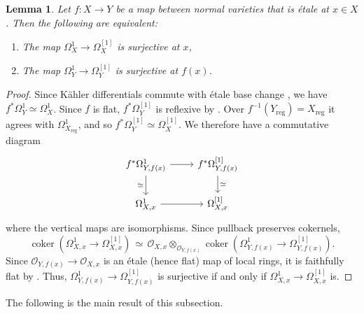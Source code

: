 \documentclass{amsart}
\newtheorem{lemma}[lemma]{Lemma}
\theoremstyle{definition}
\newcommand{\cO}{\mathcal{O}}
\DeclareMathOperator{\reg}{reg}
\DeclareMathOperator{\coker}{coker}
\begin{document}
\begin{lemma}\label{lemma:surj-etale-local}
    Let $f: X\to Y$ be a map between normal varieties that is \'etale at $x\in X$. Then the following are equivalent:
    \begin{enumerate}
        \item The map $\Omega_X^1\to \Omega_X^{[1]}$ is surjective at $x$,
        \item The map $\Omega_Y^1\to \Omega_Y^{[1]}$ is surjective at $f(x)$.
    \end{enumerate}
\end{lemma}
\begin{proof}

    Since K\"ahler differentials commute with \'etale base change \cite[Tag 0FLV]{stacks-project}, we have $f^*\Omega_Y^1\simeq\Omega_X^1$. Since $f$ is flat, $f^*\Omega_Y^{[1]}$ is reflexive by \cite[Proposition 1.8]{Hartshorne1980}. Over $f^{-1}(Y_{\reg})=X_{\reg}$ it agrees with $\Omega^1_{X_{\reg}}$, and so $f^*\Omega_Y^{[1]}\simeq\Omega_X^{[1]}$. We therefore have a commutative diagram
    \[\begin{tikzcd}
        f^*\Omega_{Y,f(x)}^1 \arrow[r] \arrow[d, "\simeq"'] &
f^*\Omega_{Y,f(x)}^{[1]} \arrow[d, "\simeq"] \\
\Omega_{X,x}^1 \arrow[r] &
\Omega_{X,x}^{[1]}
    \end{tikzcd}\]
    where the vertical maps are isomorphisms. Since pullback preserves cokernels, 
    \[
        \coker(\Omega^1_{X,x}\to\Omega^{[1]}_{X,x})\,\simeq\, \cO_{X,x}\otimes_{\cO_{Y,{f(x)}}}\coker(\Omega^1_{Y,f(x)}\to\Omega^{[1]}_{Y,f(x)}).
    \]
    Since $\cO_{Y, f(x)}\to\cO_{X,x}$ is an \'etale (hence flat) map of local rings, it is faithfully flat by \cite[Tag 00HR]{stacks-project}. Thus, $\Omega_{Y, f(x)}^1\to \Omega_{Y,f(x)}^{[1]}$ is surjective if and only if $\Omega_{X,x}^1\to \Omega_{X,x}^{[1]}$ is.
\end{proof}


The following is the main result of this subsection.
\end{document}
